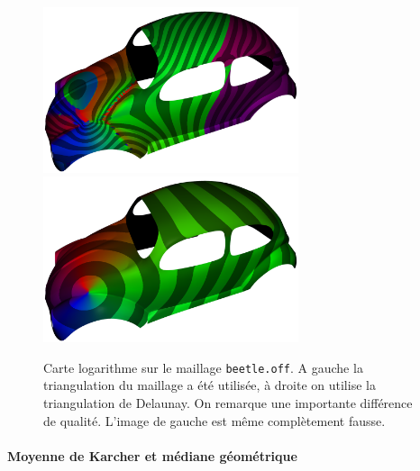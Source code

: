 \documentclass[11pt]{article}
\begin{document}
	\begin{figure}
		\centering
		\includegraphics[width=7.5cm]{log_car_without_d.png} \; \includegraphics[width=7.5cm]{log_car_with_d.png}
		\caption{Carte logarithme sur le maillage \texttt{beetle.off}. A gauche la triangulation du maillage a été utilisée, à droite on utilise la triangulation de Delaunay. On remarque une importante différence de qualité. L'image de gauche est même complètement fausse.}
		\label{fig:car}
	\end{figure}

	\paragraph{Moyenne de Karcher et médiane géométrique}
	
\end{document}
